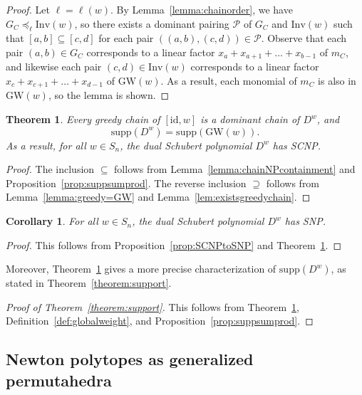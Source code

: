 \documentclass[11pt]{article}
\newtheorem{theorem}[theo]{Theorem}
\newtheorem{coro}[theo]{Corollary}
\theoremstyle{definition}
\numberwithin{equation}{section}
\newcommand{\GW}{\mathrm{GW}}
\newcommand{\id}{\mathrm{id}}
\newcommand{\Inv}{\mathrm{Inv}}
\newcommand{\Pair}{\mathcal{P}}
\newcommand{\supp}{\mathrm{supp}}
\begin{document}
\begin{proof}
    Let $\ell = \ell(w)$. By Lemma~\ref{lemma:chainorder}, we have $G_C\preceq_{\ell} \Inv(w)$, so there exists a dominant pairing $\Pair$ of $G_C$ and $\Inv(w)$ such that $[a,b]\subseteq [c,d]$ for each pair $((a,b),(c,d))\in \Pair$. Observe that each pair $(a,b)\in G_C$ corresponds to a linear factor $x_a+x_{a+1}+\dots+x_{b-1}$
    of $m_C$, and likewise each pair $(c,d)\in \Inv(w)$ corresponds to a linear factor $x_c+x_{c+1}+\dots+x_{d-1}$
    of $\GW(w)$. As a result, each monomial of $m_C$ is also in $\GW(w)$, so the lemma is shown.
\end{proof}

\begin{theorem}\label{theorem:DualSchubSCNP}
    Every greedy chain of $[\id, w]$ is a dominant chain of $D^w$, and 
    \[\supp (D^w)= \supp(\GW(w)).\]
    As a result, for all $w\in S_n$, the dual Schubert polynomial $D^w$ has SCNP.
\end{theorem}

\begin{proof}
The inclusion $\subseteq$ follows from Lemma~\ref{lemma:chainNPcontainment} and Proposition~\ref{prop:suppsumprod}. The reverse inclusion $\supseteq$ follows from Lemma~\ref{lemma:greedy=GW} and Lemma~\ref{lem:existsgreedychain}.

\end{proof}

\begin{coro}\label{cor:DualSchubSNP}
    For all $w\in S_n$, the dual Schubert polynomial $D^w$ has SNP.
\end{coro}

\begin{proof}
    This follows from Proposition~\ref{prop:SCNPtoSNP} and Theorem~\ref{theorem:DualSchubSCNP}. 
\end{proof}

Moreover, Theorem~\ref{theorem:DualSchubSCNP} gives a more precise characterization of $\supp(D^w)$, as stated in Theorem~\ref{theorem:support}.

\begin{proof}[Proof of Theorem~\ref{theorem:support}]
    This follows from Theorem~\ref{theorem:DualSchubSCNP}, Definition~\ref{def:globalweight}, and Proposition~\ref{prop:suppsumprod}.
\end{proof}

\subsection{Newton polytopes as generalized permutahedra}\label{section:newtongeneralizedpermutahedra}
\end{document}
